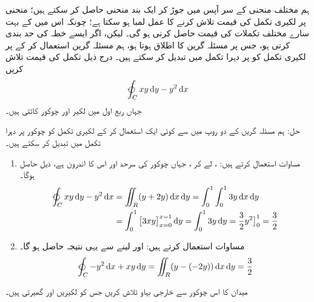  
   

ہم مختلف منحنی  کے سر آپس میں جوڑ کر ایک بند منحنی    حاصل کر سکتے ہیں؛ منحنی       پر لکیری تکمل کی قیمت تلاش کرنے کا عمل   لمبا ہو سکتا ہے؛   چونکہ اس میں   کے بہت سارے  مختلف تکملات کی قیمت حاصل کرنی ہو                           گی۔  لیکن،   اگر   ایسے  خطہ   کی حد بندی کرتی ہو، جس پر مسئلہ گرین کا اطلاق ہوتا ہو، ہم مسئلہ گرین استعمال کر کے  پر لکیری تکمل کو   پر   دہرا  تکمل  میں تبدیل کر سکتے ہیں۔    
 درج ذیل تکمل کی قیمت تلاش کریں
\begin{align*}
  \varointctrclockwise_C xy \dif y - y^2 \dif x  
\end{align*}
 جہاں ربع اول میں لکیر  اور  چوکور    کاٹتی  ہیں۔  
 
 

 حل:\quad
 ہم مسئلہ گرین کے  دو    روپ    میں سے کوئی ایک استعمال  کر  کے لکیری تکمل کو چوکور پر  دہرا تکمل میں تبدیل کر سکتے ہیں۔
\begin{enumerate}[1.]
\item
   مساوات      استعمال کرتے  ہیں: ،    لے کر ،  جہاں چوکور کی سرحد     اور اس کا  اندرون      ہے،   ذیل حاصل ہوگا۔ 
\begin{align*}
\varointctrclockwise_C xy \dif y - y^2 \dif x &= \iint_R (y + 2y) \dif x \dif y = \int_0^1 \int_0^1 3y \dif x\dif y \\   
  &= \int_0^1 \big[3xy\big]_{x=0}^{x=1} \dif y = \int_0^1 3y \dif y =\frac{3}{2}y^2\big]_0^1= \frac{3}{2} 
\end{align*}
\item
  مساوات  استعمال کرتے  ہیں:  اور  لینے سے یہی نتیجہ حاصل ہو گا۔ 
\begin{align*}
\varointctrclockwise_C -y^2 \dif x + xy \dif y = \iint_R (y - (-2y)) \dif x \dif y = \frac{3}{2}  
\end{align*}
\end{enumerate}

 میدان  کا اس چوکور سے  خارجی  بہاو تلاش کریں جس کو لکیریں   اور   گھیرتی ہیں۔  

